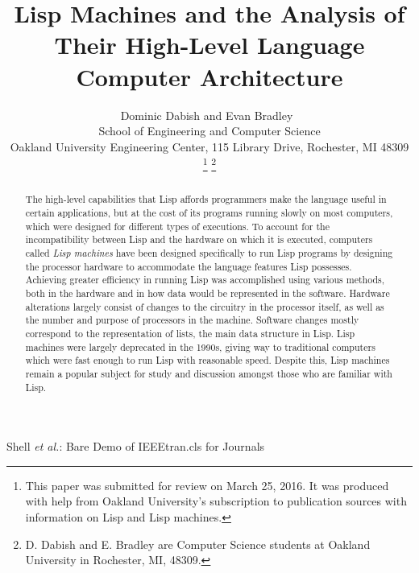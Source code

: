 \documentclass[journal]{IEEEtran}
\begin{document}
%
\title{Lisp Machines and the Analysis of Their High-Level Language Computer Architecture}

\author{
	\IEEEauthorblockN
		{
			Dominic Dabish and Evan Bradley\
		}
	\IEEEauthorblockN
		{
			\\School of Engineering and Computer Science
		}
	\IEEEauthorblockN
		{
			\\Oakland University Engineering Center, 115 Library Drive, Rochester, MI 48309
		}
\thanks{
This paper was submitted for review on March 25, 2016. It was produced with help from Oakland University's subscription to publication sources with information on Lisp and Lisp machines.
}%
\thanks{
D. Dabish and E. Bradley are Computer Science students at Oakland University in Rochester, MI, 			48309. 
}%
}

%
{Shell \MakeLowercase{\textit{et al.}}: Bare Demo of IEEEtran.cls for Journals}

\maketitle

\begin{abstract}
The high-level capabilities that Lisp affords programmers make the language useful in certain applications, but at the cost of its programs running slowly on most computers, which were designed for different types of executions. To account for the incompatibility between Lisp and the hardware on which it is executed, computers called \textit{Lisp machines} have been designed specifically to run Lisp programs by designing the processor hardware to accommodate the language features Lisp possesses. Achieving greater efficiency in running Lisp was accomplished using various methods, both in the hardware and in how data would be represented in the software. Hardware alterations largely consist of changes to the circuitry in the processor itself, as well as the number and purpose of processors in the machine. Software changes mostly correspond to the representation of lists, the main data structure in Lisp. Lisp machines were largely deprecated in the 1990s, giving way to traditional computers which were fast enough to run Lisp with reasonable speed. Despite this, Lisp machines remain a popular subject for study and discussion amongst those who are familiar with Lisp.
\end{abstract}
\end{document}
